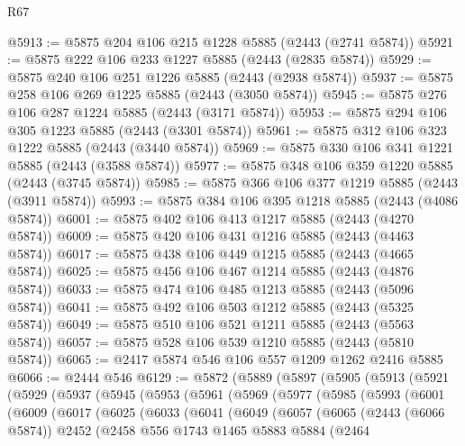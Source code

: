 \begin{lexlean}{R67}
\begin{coremodule}
@5913 := @5875 @204 @106 @215 @1228 @5885 (@2443 (@2741 @5874))
@5921 := @5875 @222 @106 @233 @1227 @5885 (@2443 (@2835 @5874))
@5929 := @5875 @240 @106 @251 @1226 @5885 (@2443 (@2938 @5874))
@5937 := @5875 @258 @106 @269 @1225 @5885 (@2443 (@3050 @5874))
@5945 := @5875 @276 @106 @287 @1224 @5885 (@2443 (@3171 @5874))
@5953 := @5875 @294 @106 @305 @1223 @5885 (@2443 (@3301 @5874))
@5961 := @5875 @312 @106 @323 @1222 @5885 (@2443 (@3440 @5874))
@5969 := @5875 @330 @106 @341 @1221 @5885 (@2443 (@3588 @5874))
@5977 := @5875 @348 @106 @359 @1220 @5885 (@2443 (@3745 @5874))
@5985 := @5875 @366 @106 @377 @1219 @5885 (@2443 (@3911 @5874))
@5993 := @5875 @384 @106 @395 @1218 @5885 (@2443 (@4086 @5874))
@6001 := @5875 @402 @106 @413 @1217 @5885 (@2443 (@4270 @5874))
@6009 := @5875 @420 @106 @431 @1216 @5885 (@2443 (@4463 @5874))
@6017 := @5875 @438 @106 @449 @1215 @5885 (@2443 (@4665 @5874))
@6025 := @5875 @456 @106 @467 @1214 @5885 (@2443 (@4876 @5874))
@6033 := @5875 @474 @106 @485 @1213 @5885 (@2443 (@5096 @5874))
@6041 := @5875 @492 @106 @503 @1212 @5885 (@2443 (@5325 @5874))
@6049 := @5875 @510 @106 @521 @1211 @5885 (@2443 (@5563 @5874))
@6057 := @5875 @528 @106 @539 @1210 @5885 (@2443 (@5810 @5874))
@6065 := @2417 @5874 @546 @106 @557 @1209 @1262 @2416 @5885
@6066 := @2444 @546
@6129 := @5872
    (@5889
      (@5897
        (@5905
          (@5913
            (@5921
              (@5929
                (@5937
                  (@5945
                    (@5953
                      (@5961
                        (@5969
                          (@5977
                            (@5985
                              (@5993
                                (@6001
                                  (@6009
                                    (@6017
                                      (@6025
                                        (@6033
                                          (@6041
                                            (@6049
                                              (@6057
                                                (@6065
                                                  (@2443 (@6066 @5874))
                                                  @2452
                                                  (@2458
                                                    @556
                                                    @1743
                                                    @1465
                                                    @5883
                                                    @5884
                                                    (@2464

\end{coremodule}
\end{lexlean}
